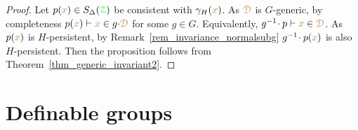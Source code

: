 \begin{proof}
  Let $p({\color{brown} x})\in S_\Delta({\color{green}\EuScript Z})$ be consistent with $\gamma_H({\color{brown} x})$.
  As ${\color{brown}\EuScript D}$ is $G$-generic, by completeness $p({\color{brown} x})\vdash{\color{brown}x}\in g{\cdot}{\color{brown}\EuScript D}$ for some $g\in G$.
  Equivalently, $g^{-1}\!\cdot p\vdash{\color{brown}x}\in{\color{brown}\EuScript D}$.
  As $p({\color{brown} x})$ is $H$-persistent, by Remark~\ref{rem_invariance_normalsubg} $g^{-1}\!\cdot p({\color{brown} x})$ is also $H$-persistent.
  Then the proposition follows from Theorem~\ref{thm_generic_invariant2}.
\end{proof}
\begin{comment}
The following normal subgroup of $G$ is particularly interesting

{
\def\medrel#1{\parbox[t]{5ex}{$\displaystyle\hfil #1$}}
\def\ceq#1#2#3{\parbox[t]{8ex}{$\displaystyle #1$}\medrel{#2}{$\displaystyle #3$}}

\ceq{\hfill G^0}{=}{\big\{g\in G\ :\ g{\cdot}\mrD=\mrD\textrm{ for every }G\textrm{-generic }\BDelta(\grZ)\textrm{-type-definable set }\mrD\big\}}.
}

Note that by Exercise~\ref{ex_generic_type_vs_formulas} we can replace type-definable with definable in the definition of $G^0$.

\begin{proposition}
  Assume the action of $G$ is regular.
  Let $K\le G$ be such that all $K$-orbits (that is, $K{\cdot}{\mr a}$, for ${\mr a}\in\mrX$) are $\BDelta(\grZ)$-type-definable.
  Then, if $K$ has finite index, $G^0\le K$.
\end{proposition}

\begin{proof}
  Let $g\in G^0$.
  As $K$ has finite index and the action is transitive $K{\cdot}{\mr a}$ is $G$-generic for every ${\mr a}\in\mrX$.
  Then $g{\cdot}K{\cdot}{\mr a}=K{\cdot}{\mr a}$.
  By regularity, $g{\cdot}K=K$, then $g\in K$.
\end{proof}
\end{comment}

\section{Definable groups}\label{definablegroups}

\def\medrel#1{\parbox[t]{5ex}{$\displaystyle\hfil #1$}}
\def\ceq#1#2#3{\parbox[t]{25ex}{$\displaystyle #1$}\medrel{#2}{$\displaystyle #3$}}

